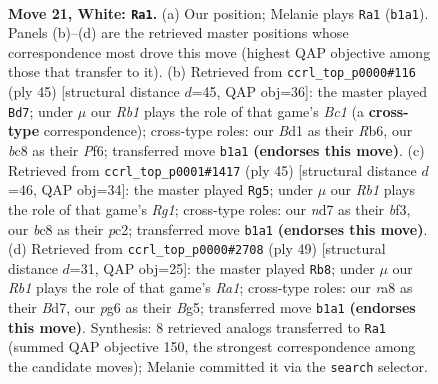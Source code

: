 \documentclass[11pt]{article}
\begin{document}
\clearpage

\begin{figure}[p]\centering
\begin{subfigure}{0.46\textwidth}\centering
\resizebox{\linewidth}{!}{%
\newchessgame
\chessboard[
  setfen={r1b3k1/3n4/1p4p1/2p2p2/p1P2P1p/2P5/P5PP/1RBB2K1 w - - 0 21},
  showmover=false,
  pgfstyle=straightmove, color=movearrow, markmove={b1-a1}
]}
\caption{}
\end{subfigure}\hfill
\begin{subfigure}{0.46\textwidth}\centering
\resizebox{\linewidth}{!}{%
\newchessgame
\chessboard[
  setfen={2b1k3/5p2/1rpb1p1p/p6P/3P4/1P2P2P/P4K2/R4BN1 b - - 1 23},
  showmover=false,
  pgfstyle=straightmove, color=movearrow, markmove={c8-d7}
]}
\caption{}
\end{subfigure}
\\[4pt]
\begin{subfigure}{0.46\textwidth}\centering
\resizebox{\linewidth}{!}{%
\newchessgame
\chessboard[
  setfen={1k4r1/pp3p2/4p3/1P2b3/4Pp1p/5B2/1PP2PPP/2K4R b - - 2 23},
  showmover=false,
  pgfstyle=straightmove, color=movearrow, markmove={g8-g5}
]}
\caption{}
\end{subfigure}\hfill
\begin{subfigure}{0.46\textwidth}\centering
\resizebox{\linewidth}{!}{%
\newchessgame
\chessboard[
  setfen={r4k2/3b1ppp/4p3/4P1bP/1pB5/1P1N1P2/P5P1/1K5R b - - 2 25},
  showmover=false,
  pgfstyle=straightmove, color=movearrow, markmove={a8-b8}
]}
\caption{}
\end{subfigure}
\caption{\textbf{Move 21, White: \texttt{Ra1}.} (a) Our position; Melanie plays \texttt{Ra1} (\texttt{b1a1}). Panels (b)--(d) are the retrieved master positions whose correspondence most drove this move (highest QAP objective among those that transfer to it). (b) Retrieved from \texttt{ccrl\_top\_p0000\#116} (ply 45) [structural distance $d$=45, QAP obj=36]: the master played \texttt{Bd7}; under $\mu$ our \emph{Rb1} plays the role of that game's \emph{Bc1} (a \textbf{cross-type} correspondence); cross-type roles: our \emph{B}d1 as their \emph{R}b6, our \emph{b}c8 as their \emph{P}f6; transferred move \texttt{b1a1} \textbf{(endorses this move)}. (c) Retrieved from \texttt{ccrl\_top\_p0001\#1417} (ply 45) [structural distance $d$=46, QAP obj=34]: the master played \texttt{Rg5}; under $\mu$ our \emph{Rb1} plays the role of that game's \emph{Rg1}; cross-type roles: our \emph{n}d7 as their \emph{b}f3, our \emph{b}c8 as their \emph{p}c2; transferred move \texttt{b1a1} \textbf{(endorses this move)}. (d) Retrieved from \texttt{ccrl\_top\_p0000\#2708} (ply 49) [structural distance $d$=31, QAP obj=25]: the master played \texttt{Rb8}; under $\mu$ our \emph{Rb1} plays the role of that game's \emph{Ra1}; cross-type roles: our \emph{r}a8 as their \emph{B}d7, our \emph{p}g6 as their \emph{B}g5; transferred move \texttt{b1a1} \textbf{(endorses this move)}. Synthesis: 8 retrieved analogs transferred to \texttt{Ra1} (summed QAP objective 150, the strongest correspondence among the candidate moves); Melanie committed it via the \texttt{search} selector.}
\label{fig:thought-m40}
\end{figure}
\end{document}
